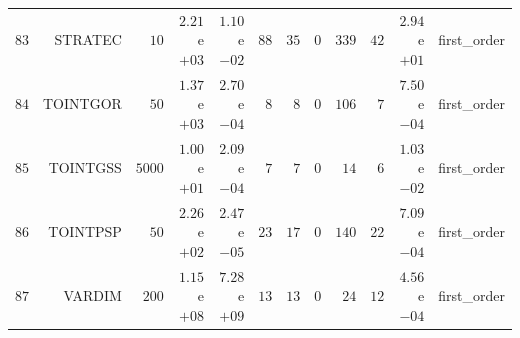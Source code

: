 \begin{longtable}{rrrrrrrrrrrr}
  \(    83\) & STRATEC & \(    10\) & \( 2.21\)e\(+03\) & \( 1.10\)e\(-02\) & \(    88\) & \(    35\) & \(     0\) & \(   339\) & \(    42\) & \( 2.94\)e\(+01\) & first\_order \\
  \(    84\) & TOINTGOR & \(    50\) & \( 1.37\)e\(+03\) & \( 2.70\)e\(-04\) & \(     8\) & \(     8\) & \(     0\) & \(   106\) & \(     7\) & \( 7.50\)e\(-04\) & first\_order \\
  \(    85\) & TOINTGSS & \(  5000\) & \( 1.00\)e\(+01\) & \( 2.09\)e\(-04\) & \(     7\) & \(     7\) & \(     0\) & \(    14\) & \(     6\) & \( 1.03\)e\(-02\) & first\_order \\
  \(    86\) & TOINTPSP & \(    50\) & \( 2.26\)e\(+02\) & \( 2.47\)e\(-05\) & \(    23\) & \(    17\) & \(     0\) & \(   140\) & \(    22\) & \( 7.09\)e\(-04\) & first\_order \\
  \(    87\) & VARDIM & \(   200\) & \( 1.15\)e\(+08\) & \( 7.28\)e\(+09\) & \(    13\) & \(    13\) & \(     0\) & \(    24\) & \(    12\) & \( 4.56\)e\(-04\) & first\_order \\\hline
\end{longtable}
